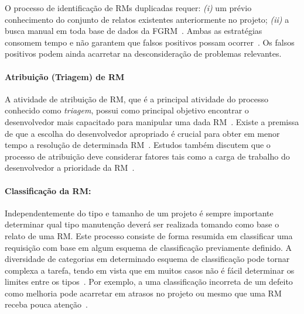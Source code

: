 O processo de identificação de RMs duplicadas requer: \textit{(i)} um prévio
conhecimento do conjunto de relatos existentes anteriormente no projeto;
\textit{(ii)} a busca manual em toda base de dados da
FGRM~\cite{banerjee2012automated,
	Lerch:2013:FDY:2495256.2495763,hindle2016contextual}. Ambas as estratégias
consomem tempo e não garantem que falsos positivos possam
ocorrer~\cite{kaushik2012comparative}. Os falsos positivos podem ainda acarretar
na desconsideração de problemas relevantes.

\paragraph{Atribuição (Triagem) de RM} A atividade de atribuição de RM, que é a
principal atividade do processo conhecido como \textit{triagem}, possui como
principal objetivo encontrar o desenvolvedor mais capacitado para manipular uma
dada RM~\cite{cavalcanti2014challenges}. Existe a premissa de que a escolha do
desenvolvedor apropriado é crucial para obter em menor tempo a re\-so\-lu\-ção
de determinada RM~\cite{di2002approach}. Estudos também discutem que o processo
de atribuição deve considerar fatores tais como a carga de trabalho do
desenvolvedor a prioridade da RM~\cite{aljarah2011selecting}.

\paragraph{Classificação da RM:} Independentemente do tipo e tamanho de um
projeto é sempre importante determinar qual tipo manutenção deverá ser realizada
tomando como base o relato de uma RM\@.  Este processo consiste de forma
resumida em classificar uma requisição com base em algum esquema de
classificação previamente definido. A diversidade de categorias em determinado
esquema de classificação pode tornar complexa a tarefa, tendo em vista que em
muitos casos não é fácil determinar os limites entre os
tipos~\cite{antoniol2008bug}. Por exemplo, a uma classificação incorreta de um
defeito como melhoria pode acarretar em atrasos no projeto ou mesmo que uma RM
receba pouca atenção~\cite{cavalcanti2014challenges}.

